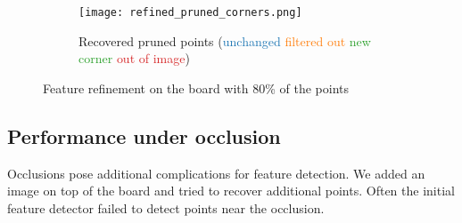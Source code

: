 \begin{figure}[h]
	\centering
	\begin{subfigure}[h]{0.45\linewidth}
	\end{subfigure}
	\hfill
	\begin{subfigure}[h]{0.45\linewidth}
	\end{subfigure}
	\begin{subfigure}[h]{\linewidth}
		\centering
		\texttt{[image: refined\_pruned\_corners.png]}
		\caption{Recovered pruned points
			(\textcolor[HTML]{1f77b4}{unchanged}
			\textcolor[HTML]{ff7f0e}{filtered out}
			\textcolor[HTML]{2ca02c}{new corner}
			\textcolor[HTML]{d62728}{out of image})}
	\end{subfigure}
	\hfill
	\caption{Feature refinement on the board with 80\% of the points}
\end{figure}

\newpage
\subsection{Performance under occlusion}\label{sub:performance_under_occlusion}

Occlusions pose additional complications for feature detection. We added an
image on top of the board and tried to recover additional points. Often the
initial feature detector failed to detect points near the occlusion.

